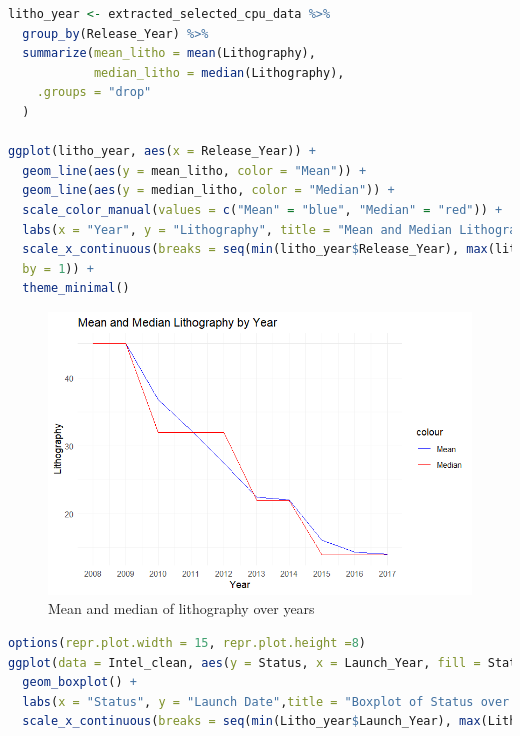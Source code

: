 \begin{lstlisting}[language=R]
litho_year <- extracted_selected_cpu_data %>% 
  group_by(Release_Year) %>%
  summarize(mean_litho = mean(Lithography),
            median_litho = median(Lithography),
    .groups = "drop"
  )

ggplot(litho_year, aes(x = Release_Year)) +
  geom_line(aes(y = mean_litho, color = "Mean")) +
  geom_line(aes(y = median_litho, color = "Median")) +
  scale_color_manual(values = c("Mean" = "blue", "Median" = "red")) +
  labs(x = "Year", y = "Lithography", title = "Mean and Median Lithography by Year") +
  scale_x_continuous(breaks = seq(min(litho_year$Release_Year), max(litho_year$Release_Year),
  by = 1)) +
  theme_minimal()
\end{lstlisting}

\begin{figure}[ht]
  \centering
  \includegraphics[width=1\linewidth]{img/Litho_Year.png}
  \vspace{1pt}
  \caption{Mean and median of lithography over years}
\end{figure}

\begin{lstlisting}[language=R]
options(repr.plot.width = 15, repr.plot.height =8) 
ggplot(data = Intel_clean, aes(y = Status, x = Launch_Year, fill = Status)) +
  geom_boxplot() +
  labs(x = "Status", y = "Launch Date",title = "Boxplot of Status over Year") +
  scale_x_continuous(breaks = seq(min(Litho_year$Launch_Year), max(Litho_year$Launch_Year), by = 1))
\end{lstlisting}


